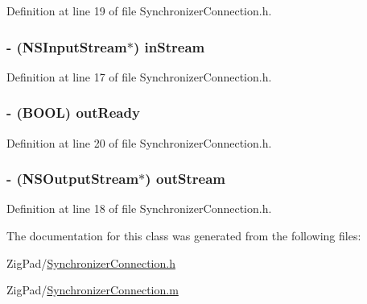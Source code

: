 Definition at line 19 of file SynchronizerConnection.h.

\hypertarget{interface_synchronizer_connection_a6518f57e11a87d0fa1592f43e6c09ef6}{
\subsubsection[{inStream}]{\setlength{\rightskip}{0pt plus 5cm}-\/ (NSInputStream$\ast$) inStream}}
\label{interface_synchronizer_connection_a6518f57e11a87d0fa1592f43e6c09ef6}


Definition at line 17 of file SynchronizerConnection.h.

\hypertarget{interface_synchronizer_connection_a64d91b9747d4876f20415079bb9d9f7f}{
\subsubsection[{outReady}]{\setlength{\rightskip}{0pt plus 5cm}-\/ (BOOL) outReady}}
\label{interface_synchronizer_connection_a64d91b9747d4876f20415079bb9d9f7f}


Definition at line 20 of file SynchronizerConnection.h.

\hypertarget{interface_synchronizer_connection_a40bb251ce886c4b07fe1c1e4c5107eeb}{
\subsubsection[{outStream}]{\setlength{\rightskip}{0pt plus 5cm}-\/ (NSOutputStream$\ast$) outStream}}
\label{interface_synchronizer_connection_a40bb251ce886c4b07fe1c1e4c5107eeb}


Definition at line 18 of file SynchronizerConnection.h.



The documentation for this class was generated from the following files:\begin{DoxyCompactItemize}
\item 
ZigPad/\hyperlink{_synchronizer_connection_8h}{SynchronizerConnection.h}\item 
ZigPad/\hyperlink{_synchronizer_connection_8m}{SynchronizerConnection.m}\end{DoxyCompactItemize}

